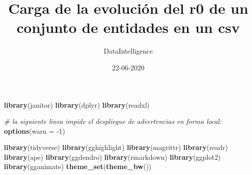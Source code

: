 \documentclass[
]{article}
\title{Carga de la evolución del r0 de un conjunto de entidades en un csv}
\author{DataIntelligence}
\date{22-06-2020}
\newenvironment{Shaded}{\begin{snugshade}}{\end{snugshade}}
\newcommand{\CommentTok}[1]{\textcolor[rgb]{0.56,0.35,0.01}{\textit{#1}}}
\newcommand{\DataTypeTok}[1]{\textcolor[rgb]{0.13,0.29,0.53}{#1}}
\newcommand{\DecValTok}[1]{\textcolor[rgb]{0.00,0.00,0.81}{#1}}
\newcommand{\KeywordTok}[1]{\textcolor[rgb]{0.13,0.29,0.53}{\textbf{#1}}}
\newcommand{\NormalTok}[1]{#1}
\newcommand{\OperatorTok}[1]{\textcolor[rgb]{0.81,0.36,0.00}{\textbf{#1}}}
\newcommand{\StringTok}[1]{\textcolor[rgb]{0.31,0.60,0.02}{#1}}
\begin{document}
\maketitle

\begin{Shaded}
\begin{Highlighting}[]
\KeywordTok{library}\NormalTok{(janitor)}
\KeywordTok{library}\NormalTok{(dplyr)}
\KeywordTok{library}\NormalTok{(readxl)}

\CommentTok{# la siguiente linea impide el despliegue de advertencias en forma local:}
\KeywordTok{options}\NormalTok{(}\DataTypeTok{warn =} \DecValTok{-1}\NormalTok{)}

\KeywordTok{library}\NormalTok{(tidyverse)}
\KeywordTok{library}\NormalTok{(gghighlight)}
\KeywordTok{library}\NormalTok{(magrittr)}
\KeywordTok{library}\NormalTok{(readr)}
\KeywordTok{library}\NormalTok{(ape)}
\KeywordTok{library}\NormalTok{(ggdendro)}
\KeywordTok{library}\NormalTok{(rmarkdown)}
\KeywordTok{library}\NormalTok{(ggplot2)}
\KeywordTok{library}\NormalTok{(gganimate)}
\KeywordTok{theme_set}\NormalTok{(}\KeywordTok{theme_bw}\NormalTok{()) }
\end{Highlighting}
\end{Shaded}

\begin{Shaded}
\end{Shaded}
\end{document}
